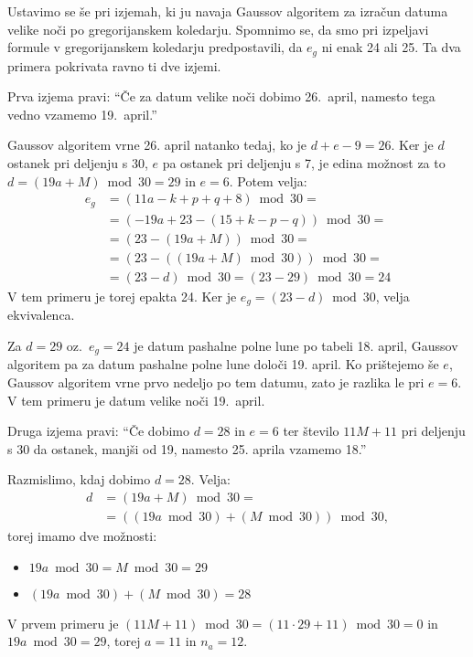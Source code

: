 \documentclass[a4paper,12pt]{article}
\begin{document}
Ustavimo se še pri izjemah, ki ju navaja Gaussov algoritem za izračun datuma 
velike noči po gregorijanskem koledarju. Spomnimo se, da smo pri izpeljavi 
formule v gregorijanskem koledarju predpostavili, da $e_g$ ni enak 24 ali 25. 
Ta dva primera pokrivata ravno ti dve izjemi.

Prva izjema pravi: ``Če za datum velike noči dobimo 26.\ april, namesto tega vedno 
vzamemo 19.\ april.''

Gaussov algoritem vrne 26. april natanko tedaj, ko je $d + e - 9 = 26$. Ker je 
$d$ ostanek pri deljenju s 30, $e$ pa ostanek pri deljenju s 7, je edina možnost 
za to $d = (19 a + M) \bmod 30 = 29$ in $e = 6$. 
Potem velja:
\begin{align*}
    e_g &= (11a - k + p + q + 8) \bmod 30 = \\
        &= (-19 a + 23 - (15 + k - p - q)) \bmod 30 = \\
        &= (23 - (19 a + M)) \bmod 30 = \\
        &= (23 - ((19 a + M) \bmod 30)) \bmod 30 = \\
        &= (23 - d) \bmod 30 = (23 - 29) \bmod 30 = 24
\end{align*}
V tem primeru je torej epakta 24. Ker je $e_g = (23 - d) \bmod 30$, velja ekvivalenca.

Za $d = 29$ oz.\ $e_g = 24$ je datum pashalne polne lune po tabeli 18. april, 
Gaussov algoritem pa za datum pashalne polne lune določi 19. april. Ko prištejemo 
še $e$, Gaussov algoritem vrne prvo nedeljo po tem datumu, zato je razlika le 
pri $e=6$. V tem primeru je datum velike noči 19.\ april.

Druga izjema pravi: ``Če dobimo $d = 28$ in $e = 6$ ter število $11M + 11$ pri deljenju
s 30 da ostanek, manjši od 19, namesto 25. aprila vzamemo 18.''

Razmislimo, kdaj dobimo $d=28$. Velja:
\begin{align*}
    d &= (19 a + M) \bmod 30 = \\
    &= ((19 a \bmod 30) + (M \bmod 30)) \bmod 30, 
\end{align*}
torej imamo dve možnosti:
\begin{itemize}
    \item $19 a \bmod 30 = M \bmod 30 = 29$
    \item $(19 a \bmod 30) + (M \bmod 30) = 28$
\end{itemize}

V prvem primeru je $(11M + 11) \bmod 30 = (11 \cdot 29 + 11) \bmod 30 = 0$ in 
$19 a \bmod 30 = 29$, torej $a = 11$ in $n_a = 12$. 
 
\end{document}
